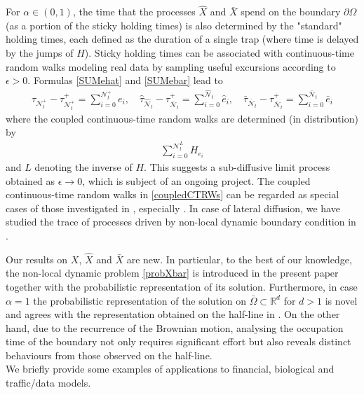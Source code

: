 \documentclass[11pt,a4paper]{article}
\newcommand{\magenta}{black}
\begin{document}
For $\alpha \in (0,1)$, the time that the processes $\hat{X}$ and $\bar{X}$ spend on the boundary $\partial \Omega$ (as a portion of the sticky holding times) is also determined by the "standard" holding times, each defined as the duration of a single trap (where time is delayed by the jumps of $H$). {\color{\magenta} Sticky holding times can be associated with continuous-time random walks modeling real data by sampling useful excursions according to $\epsilon>0$. Formulas \eqref{SUMehat} and \eqref{SUMebar} lead to 
\begin{align}
\tau_{\mathcal{N}^+_t} - \tau^+_{\mathcal{N}^+_t} = \sum_{i=0}^{\mathcal{N}^+_t} e_i, \quad \hat{\tau}_{\hat{\mathcal{N}}_t} - \tau^+_{\bar{\mathcal{N}}_t} = \sum_{i=0}^{\hat{\mathcal{N}}_t} \hat{e}_i, \quad \bar{\tau}_{\bar{\mathcal{N}}_t} - \tau^+_{\bar{\mathcal{N}}_t} = \sum_{i=0}^{\bar{\mathcal{N}}_t} \bar{e}_i 
\label{coupledCTRWs}
\end{align}
where the coupled continuous-time random walks are determined (in distribution) by
\begin{align*}
\sum_{i=0}^{\mathcal{N}^L_t} H_{e_i}
\end{align*}
and $L$ denoting the inverse of $H$. This suggests a sub-diffusive limit process obtained as $\epsilon \to 0$, which is subject of an ongoing project. The coupled continuous-time random walks in \eqref{coupledCTRWs} can be regarded as special cases of those investigated in \cite{OnTelegSign}, especially \cite[Section 4.3]{OnTelegSign}. In case of lateral diffusion, we have studied the trace of processes driven by non-local dynamic boundary condition in \cite{CapDovEECT}. \\
}

Our results on $X$, $\hat{X}$ and $\bar{X}$ are new. In particular, to the best of our knowledge, the non-local dynamic problem \eqref{probXbar} is introduced in the present paper together with the probabilistic representation of its solution. Furthermore, in case $\alpha=1$ the probabilistic representation of the solution on $\bar{\Omega} \subset \mathbb{R}^d$ for $d>1$  is novel and agrees with the representation obtained on the half-line in \cite{ItoMcK}. {\color{\magenta}On the other hand, due to the recurrence of the Brownian motion, analysing the occupation time of the boundary not only requires significant effort but also reveals distinct behaviours from those observed on the half-line.} \\


We briefly provide some examples of applications to financial, biological and traffic/data  models. 
\end{document}
